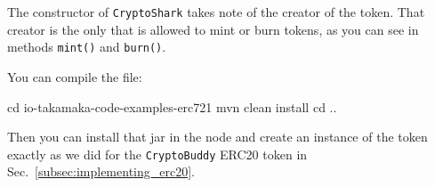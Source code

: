 %
The constructor of \texttt{CryptoShark} takes note of the creator of the token.
That creator is the only that is allowed to mint or burn tokens, as
you can see in methods \texttt{mint()} and \texttt{burn()}.

You can compile the file:
%
\begin{shellcommandbox}\begin{ttlst}
cd io-takamaka-code-examples-erc721
mvn clean install
cd ..
\end{ttlst}\end{shellcommandbox}
%
Then you can install that jar in the node and create an instance of the token
exactly as we did for the \texttt{CryptoBuddy} ERC20 token in Sec.~\ref{subsec:implementing_erc20}.